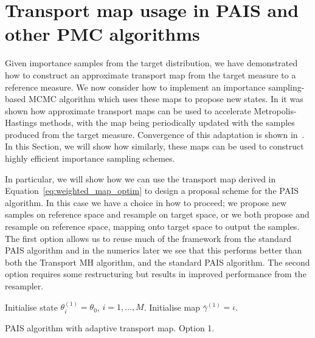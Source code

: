 \documentclass[final]{siamltex}
\begin{document}
\section[Transport map MCMC]{Transport map usage in PAIS
  and other PMC algorithms}\label{sec:TPAIS}

Given importance samples from the target distribution, we have demonstrated how to construct an approximate transport map from the
target measure to a reference measure. We now consider how to
implement an importance sampling-based MCMC algorithm which uses
these maps to propose new states. In \cite{parno2014transport} it was
shown how approximate transport maps can be used to accelerate
Metropolis-Hastings methods, with the map being periodically updated
with the samples produced from the target measure. Convergence of this
adaptation is shown in~\cite{parno2014transport}. In this Section, we
will show how similarly, these maps can be used to construct highly
efficient importance sampling schemes.

In particular, we will show how we can use the transport map derived in Equation~\eqref{eq:weighted_map_optim} to
design a proposal scheme for the PAIS algorithm. In this case we have a choice in how to proceed; we
propose new samples on reference space and resample on target space, or we both propose and resample on reference space, mapping onto target space to output the samples. The first option allows us to reuse much of the framework
from the standard PAIS algorithm and in the numerics later we see that this performs better than
both the Transport MH algorithm, and the standard PAIS algorithm. The second option requires some
restructuring but results in improved performance from the resampler.

\begin{table}
\begin{algorithm}[H]
\DontPrintSemicolon
\BlankLine
Initialise state $\theta^{(1)}_i = \theta_0$, \quad $i = 1,\dots,M$.\;
Initialise map $\bar{\gamma}^{(1)} = \iota$.\;
\caption{PAIS algorithm with adaptive transport map. Option 1.\label{alg:TransportPAIS1}}
\end{algorithm}
\end{table}
\end{document}
